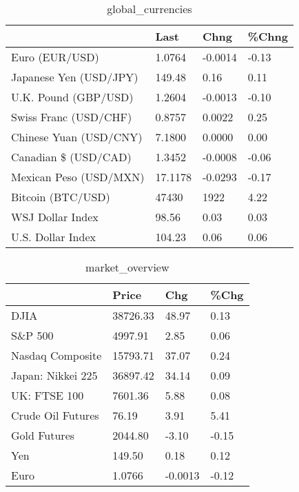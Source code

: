\documentclass{article}%
\begin{document}
%


\begin{table}[htbp]%
\caption{global\_currencies}%
\centering%
\begin{adjustbox}{width=1\textwidth}%
\begin{tabular}{llll}
\toprule
                       &    Last &    Chng & \%Chng \\
\midrule
        Euro (EUR/USD) &  1.0764 & -0.0014 & -0.13 \\
Japanese Yen (USD/JPY) &  149.48 &    0.16 &  0.11 \\
  U.K. Pound (GBP/USD) &  1.2604 & -0.0013 & -0.10 \\
 Swiss Franc (USD/CHF) &  0.8757 &  0.0022 &  0.25 \\
Chinese Yuan (USD/CNY) &  7.1800 &  0.0000 &  0.00 \\
  Canadian \$ (USD/CAD) &  1.3452 & -0.0008 & -0.06 \\
Mexican Peso (USD/MXN) & 17.1178 & -0.0293 & -0.17 \\
     Bitcoin (BTC/USD) &   47430 &    1922 &  4.22 \\
      WSJ Dollar Index &   98.56 &    0.03 &  0.03 \\
     U.S. Dollar Index &  104.23 &    0.06 &  0.06 \\
\bottomrule
\end{tabular}
%
\end{adjustbox}%
\end{table}

%


\begin{table}[htbp]%
\caption{market\_overview}%
\centering%
\begin{adjustbox}{width=1\textwidth}%
\begin{tabular}{llll}
\toprule
                  &    Price &     Chg &  \%Chg \\
\midrule
             DJIA & 38726.33 &   48.97 &  0.13 \\
          S\&P 500 &  4997.91 &    2.85 &  0.06 \\
 Nasdaq Composite & 15793.71 &   37.07 &  0.24 \\
Japan: Nikkei 225 & 36897.42 &   34.14 &  0.09 \\
     UK: FTSE 100 &  7601.36 &    5.88 &  0.08 \\
Crude Oil Futures &    76.19 &    3.91 &  5.41 \\
     Gold Futures &  2044.80 &   -3.10 & -0.15 \\
              Yen &   149.50 &    0.18 &  0.12 \\
             Euro &   1.0766 & -0.0013 & -0.12 \\
\bottomrule
\end{tabular}
%
\end{adjustbox}%
\end{table}

%
\end{document}
